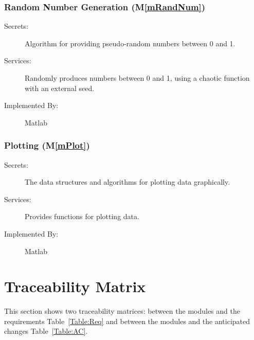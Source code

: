 \documentclass[12pt, titlepage]{article}
\newcommand{\mref}[1]{M\ref{#1}}
\begin{document}
\subsubsection{Random Number Generation (\mref{mRandNum})}

\begin{description}
\item[Secrets:] Algorithm for providing pseudo-random numbers between 0 and 1.
\item[Services:] Randomly produces numbers between 0 and 1, using a
  chaotic function with an external seed.
\item[Implemented By:] Matlab
\end{description}


\subsubsection{Plotting (\mref{mPlot})}

\begin{description}
\item[Secrets:] The data structures and algorithms for plotting data
  graphically.
\item[Services:] Provides functions for plotting data.
\item[Implemented By:] Matlab
\end{description}

\section{Traceability Matrix} \label{SecTM}

\hspace{3ex}This section shows two traceability matrices: between the
modules and the requirements Table~\ref{Table:Req} and between the
modules and the anticipated changes Table~\ref{Table:AC}.
\end{document}
